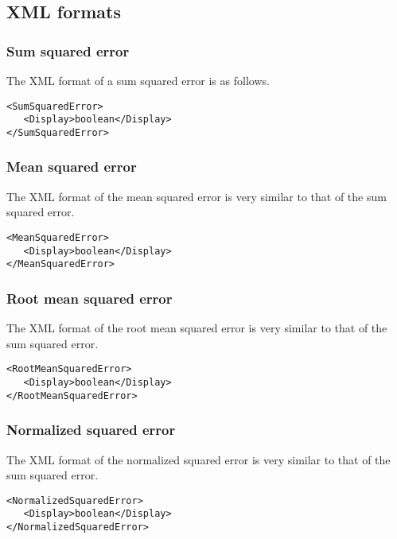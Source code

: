 \subsection*{XML formats}


\subsubsection*{Sum squared error}

The XML format of a sum squared error is as follows.

\begin{lstlisting}
<SumSquaredError>
   <Display>boolean</Display>
</SumSquaredError>
\end{lstlisting}

\subsubsection*{Mean squared error}

The XML format of the mean squared error is very similar to that of the sum squared error.

\begin{lstlisting}
<MeanSquaredError>
   <Display>boolean</Display>
</MeanSquaredError>
\end{lstlisting}

\subsubsection*{Root mean squared error}

The XML format of the root mean squared error is very similar to that of the sum squared error.

\begin{lstlisting}
<RootMeanSquaredError>
   <Display>boolean</Display>
</RootMeanSquaredError>
\end{lstlisting}

\subsubsection*{Normalized squared error}

The XML format of the normalized squared error is very similar to that of the sum squared error.

\begin{lstlisting}
<NormalizedSquaredError>
   <Display>boolean</Display>
</NormalizedSquaredError>
\end{lstlisting}

